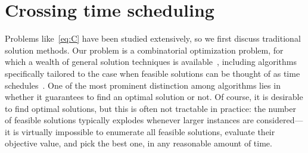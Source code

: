 \documentclass[a4paper]{report}
\theoremstyle{definition}
\theoremstyle{plain}
\begin{document}


\chapter{Crossing time scheduling}\label{chap:crossing-time-scheduling}

Problems like~\eqref{eq:C} have been studied extensively, so we first discuss
traditional solution methods.
%
Our problem is a combinatorial optimization problem, for which a wealth of
general solution techniques is
available~\cite{duIntroductionCombinatorialOptimization2022}, including
algorithms specifically tailored to the case when feasible solutions can be
thought of as time
schedules~\cite{pinedoSchedulingTheoryAlgorithms2016,grahamOptimizationApproximationDeterministic1979}.
%
One of the most prominent distinction among algorithms lies in whether it
guarantees to find an optimal solution or not.
%
Of course, it is desirable to find optimal solutions, but this is often not
tractable in practice: the number of feasible solutions typically explodes
whenever larger instances are considered---it is virtually impossible to
enumerate all feasible solutions, evaluate their objective value, and pick the
best one, in any reasonable amount of time.
\end{document}
